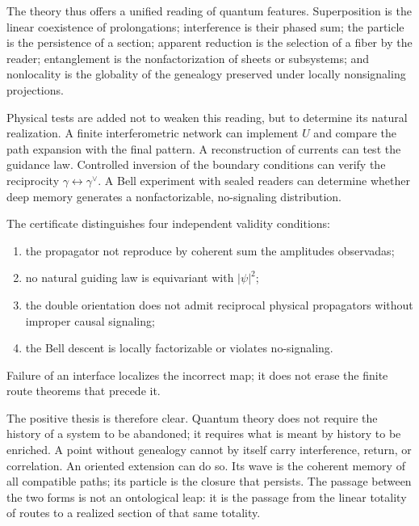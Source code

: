 The theory thus offers a unified reading of quantum features.
Superposition is the linear coexistence of prolongations; interference is their
phased sum; the particle is the persistence of a section; apparent reduction
is the selection of a fiber by the reader; entanglement is the
nonfactorization of sheets or subsystems; and nonlocality is the globality of the
genealogy preserved under locally nonsignaling projections.

Physical tests are added not to weaken this reading, but to determine its natural realization. A finite interferometric network can implement \(U\) and compare the path expansion with the final pattern. A reconstruction of currents can test the guidance law. Controlled inversion of the boundary conditions can verify the reciprocity \(\gamma\leftrightarrow\gamma^\vee\). A Bell experiment with sealed readers can determine whether deep memory generates a nonfactorizable, no-signaling distribution.

\begin{test}
The certificate distinguishes four independent validity conditions:
\begin{enumerate}
  \item the propagator not reproduce by coherent sum the amplitudes observadas;
  \item no natural guiding law is equivariant with \(|\psi|^2\);
  \item the double orientation does not admit reciprocal physical propagators without
  improper causal signaling;
  \item the Bell descent is locally factorizable or violates no-signaling.
\end{enumerate}
Failure of an interface localizes the incorrect map; it does not erase the finite
route theorems that precede it.
\end{test}

The positive thesis is therefore clear. Quantum theory does not require the
history of a system to be abandoned; it requires what is meant by history to be enriched. A point
without genealogy cannot by itself carry interference, return, or correlation.
An oriented extension can do so. Its wave is the coherent memory of all
compatible paths; its particle is the closure that persists. The passage between
the two forms is not an ontological leap: it is the passage from the linear totality of routes to
a realized section of that same totality.
